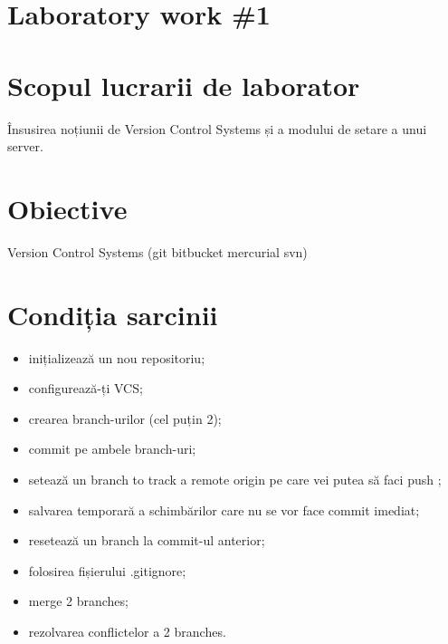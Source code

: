 \section*{Laboratory work \#1}

\section{Scopul lucrarii de laborator}
	Însusirea noțiunii de Version Control Systems și a modului de setare a unui server.
\section{Obiective}

	Version Control Systems (git \parallel bitbucket \parallel mercurial \parallel svn)

\section{Condiția sarcinii}
\begin{itemize}
\item inițializează un nou repositoriu;
\item configurează-ți VCS;
\item crearea branch-urilor (cel puțin 2);
\item commit pe ambele branch-uri;
\item setează un branch to track a remote origin pe care vei putea să faci push ;
\item salvarea temporară a schimbărilor care nu se vor face commit imediat;
\item  resetează un branch la commit-ul anterior;
\item folosirea fișierului .gitignore;
\item merge 2 branches;
\item rezolvarea conflictelor a 2 branches.
\end{itemize}
\clearpage
